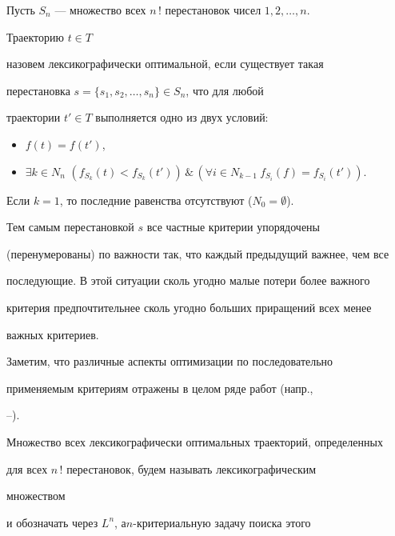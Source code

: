 


Пусть $S_n$ --- множество всех $n\,!$ перестановок чисел $1,2,\dotsc,n$. 


Траекторию $t\in T$ 


назовем лексикографически оптимальной, если существует такая 


перестановка $s=\{s_1,s_2,\dotsc,s_n\}\in S_n$, что для любой 


траектории $t'\in T$ выполняется одно из двух условий: 


\begin{itemize} 


\item[1)] $f(t)=f(t')$, 


\item[2)] $\exists k\in N_n$ $(f_{S_k}(t)<f_{S_k}(t'))\,\&\, 


(\forall i\in N_{k-1}\ f_{S_i}(f)=f_{S_i}(t'))$. 


\end{itemize} 


Если $k=1$, то последние равенства отсутствуют ($N_0=\emptyset$). 


 


Тем самым перестановкой $s$ все частные критерии упорядочены 


(перенумерованы) по важности так, что каждый предыдущий важнее, чем все 


последующие. В этой ситуации сколь угодно малые потери более важного 


критерия предпочтительнее сколь угодно больших приращений всех менее 


важных критериев. 


 


Заметим, что различные аспекты оптимизации по последовательно 


применяемым критериям отражены в целом ряде работ (напр., 


\cite{18}--\cite{23}). 


 


Множество всех лексикографически оптимальных траекторий, определенных 


для всех $n\,!$ перестановок, будем называть лексикографическим 


множеством 


и обозначать через $L^n$, а\linebreak $n$-критериальную задачу поиска этого 


